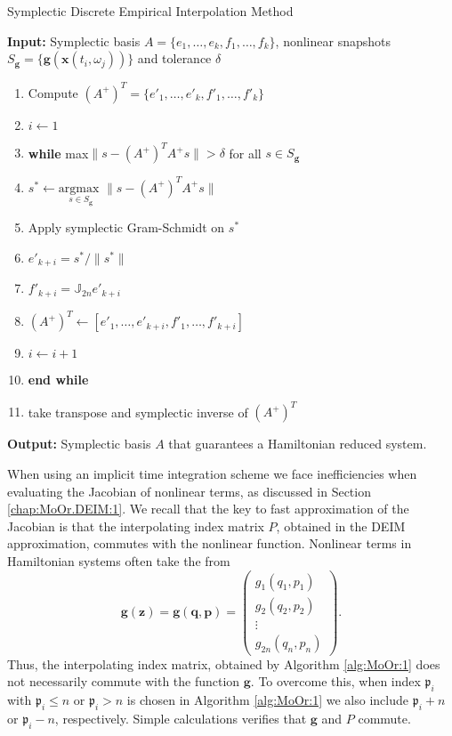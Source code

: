 \begin{algorithm} 
\caption{Symplectic Discrete Empirical Interpolation Method} \label{alg:SyMo:4}
{\bf Input:} Symplectic basis $A=\{ e_1,\dots,e_k,f_1,\dots,f_k \}$, nonlinear snapshots $S_{\mathbf g} = \{ \mathbf g(\mathbf x(t_i,\omega_j)) \}$ and tolerance $\delta$
\begin{enumerate}
\item Compute $(A^+)^T = \{ e'_1,\dots,e'_k,f'_1,\dots,f'_k \}$
\item $i \leftarrow 1$
\item \textbf{while} max$\| s - (A^+)^T A^+s \| > \delta$ for all $s\in S_{\mathbf g}$
\item \hspace{0.5cm} $s^* \leftarrow \underset{s \in S_{\mathbf g}}{\text{argmax }}\| s - (A^+)^T A^+ s \|$
\item \hspace{0.5cm} Apply symplectic Gram-Schmidt on $s^*$
\item \hspace{0.5cm} $e'_{k+i} = s^* / \| s^* \|$
\item \hspace{0.5cm} $f'_{k+i} = \mathbb J_{2n} e'_{k+i}$
\item \hspace{0.5cm} $(A^+)^T \leftarrow [e'_1,\dots,e'_{k+i},f'_1,\dots,f'_{k+i}]$
\item \hspace{0.5cm} $i\leftarrow i+1$
\item \textbf{end while}
\item take transpose and symplectic inverse of $(A^+)^T$
\end{enumerate}
\vspace{0.5cm}
{\bf Output:} Symplectic basis $A$ that guarantees a Hamiltonian reduced system.
\end{algorithm}

When using an implicit time integration scheme we face inefficiencies when evaluating the Jacobian of nonlinear terms, as discussed in Section \ref{chap:MoOr.DEIM:1}. We recall that the key to fast approximation of the Jacobian is that the interpolating index matrix $P$, obtained in the DEIM approximation, commutes with the nonlinear function. Nonlinear terms in Hamiltonian systems often take the from
\begin{equation}
	\mathbf g (\mathbf z) = \mathbf g (\mathbf q,\mathbf p) = 
	\begin{pmatrix}
		g_1(q_1,p_1) \\
		g_2(q_2,p_2) \\
		\vdots \\
		g_{2n}(q_{n},p_{n})
	\end{pmatrix}.
\end{equation}
Thus, the interpolating index matrix, obtained by Algorithm \ref{alg:MoOr:1} does not necessarily commute with the function $\mathbf g$. To overcome this, when index $\mathfrak p_i$ with $\mathfrak p_i\leq n$ or $\mathfrak p_i>n$ is chosen in Algorithm \ref{alg:MoOr:1} we also include $\mathfrak p_i + n$ or $\mathfrak p_i-n$, respectively. {\edit Simple calculations verifies that $\mathbf g$ and $P$ commute.}
